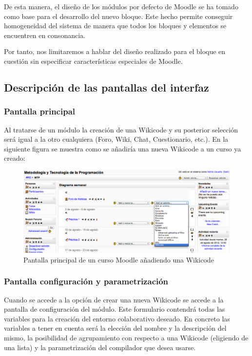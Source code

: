 De esta manera, el diseño de los módulos por defecto de Moodle se ha tomado como base para el desarrollo del nuevo bloque. Este hecho permite conseguir homogeneidad del sistema de manera que todos los bloques y elementos se encuentren en consonancia.

Por tanto, nos limitaremos a hablar del diseño realizado para el bloque en cuestión sin especificar características especiales de Moodle.

\newpage
\subsection{Descripción de las pantallas del interfaz}

\subsubsection{Pantalla principal}

Al tratarse de un módulo la creación de una Wikicode y su posterior selección será igual a la otro cualquiera (Foro, Wiki, Chat, Cuestionario, etc.). En la siguiente figura se muestra como se añadiría una nueva Wikicode a un curso ya creado:

\begin{figure}[h]
	\centering
	\includegraphics[width=\textwidth]{./img/c4main.eps}
	\caption{Pantalla principal de un curso Moodle añadiendo una Wikicode}
\end{figure}

\subsubsection{Pantalla configuración y parametrización}

Cuando se accede a la opción de crear una nueva Wikicode se accede a la pantalla de configuración del módulo. Este formulario contendrá todas las variables para la creación del entorno colaborativo deseado. En concreto las variables a tener en cuenta será la elección del nombre y la descripción del mismo, la posibilidad de agrupamiento con respecto a una Wikicode (eligiendo de una lista) y la parametrización del compilador que desea usarse.

